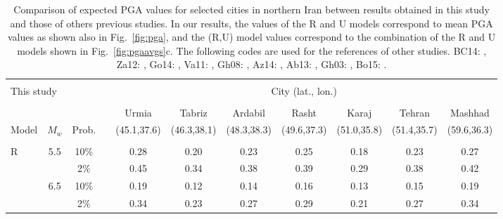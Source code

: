 \setlength{\tabcolsep}{1ex}

\begin{table*}[t]
\centering
\caption{Comparison of expected PGA values for selected cities in northern Iran between results obtained in this study and those of others previous studies. In our results, the values of the R and U models correspond to mean PGA values as shown also in Fig.~\ref{fig:pga}, and the (R,U) model values correspond to the combination of the R and U models shown in Fig.~\ref{fig:pgaavgs}c. The following codes are used for the references of other studies.
    BC14: \citet{BHRC2014},
    Za12: \citet{Zare2012},
    Go14: \citet{Golara2014},
    Va11: \citet{Vafaie2011},
    Gh08: \citet{Ghodrati2008},
    Az14: \citet{Abdollahzadeh2014a},
    Ab13: \citet{Abdi2013},
    Gh03: \citet{Ghodrati2003},
    Bo15: \citet{Boostan2015}.
    }
\begin{tabular}{lcccccccccc}
    \hline                                                                                                                      \\[-1.6ex]
    \multicolumn{2}{l}{This study}  
                    &        && \multicolumn{7}{c}{City (lat., lon.)}                                                           \\[0.6ex]
    \cline{5-11}                                                                                                                \\[-1.6ex]
            &       &        &&   Urmia     &   Tabriz    &   Ardabil   &   Rasht     &   Karaj     &   Tehran    &   Mashhad   \\
    Model   & $M_w$ & Prob.  && (45.1,37.6) & (46.3,38.1) & (48.3,38.3) & (49.6,37.3) & (51.0,35.8) & (51.4,35.7) & (59.6,36.3) \\[0.6ex]
    \cline{1-3} \cline{5-11}                                                                                                    \\[-1.6ex]
    R       &   5.5 &  10\%  &&   0.28      &   0.20      &   0.23      &   0.25      &   0.18      &   0.23      &   0.27      \\
            &       &   2\%  &&   0.45      &   0.34      &   0.38      &   0.39      &   0.29      &   0.38      &   0.42      \\
            &   6.5 &  10\%  &&   0.19      &   0.12      &   0.14      &   0.16      &   0.13      &   0.15      &   0.19      \\
            &       &   2\%  &&   0.34      &   0.23      &   0.27      &   0.29      &   0.21      &   0.27      &   0.34      \\

\end{tabular}
\end{table*}
